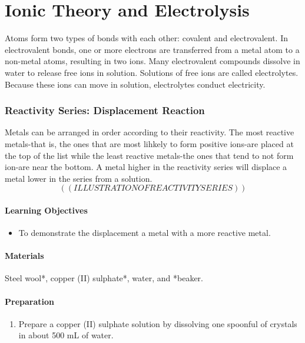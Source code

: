 \chapter{Ionic Theory and Electrolysis}

Atoms form two types of bonds with each other: covalent and electrovalent. In electrovalent bonds, one or more electrons are transferred from a metal atom to a non-metal atoms, resulting in two ions. Many electrovalent compounds dissolve in water to release free ions in solution. Solutions of free ions are called electrolytes. Because these ions can move in solution, electrolytes conduct electricity.

\subsection{Reactivity Series: Displacement Reaction}

Metals can be arranged in order according to their reactivity. The most reactive metals-that is, the ones that are most lihkely to form positive ions-are placed at the top of the list while the least reactive metals-the ones that tend to not form ion-are near the bottom. A metal higher in the reactivity series will displace a metal lower in the series from a solution. 
$$((ILLUSTRATION OF REACTIVITY SERIES))$$

\subsubsection*{Learning Objectives}
\begin{itemize}
\item{To demonstrate the displacement a metal with a more reactive metal.}
\end{itemize}

\subsubsection*{Materials}
Steel wool*, copper (II) sulphate*, water, and *beaker.

\subsubsection*{Preparation}
\begin{enumerate}
\item{Prepare a copper (II) sulphate solution by dissolving one spoonful of crystals in about 500 mL of water.}
\end{enumerate}

